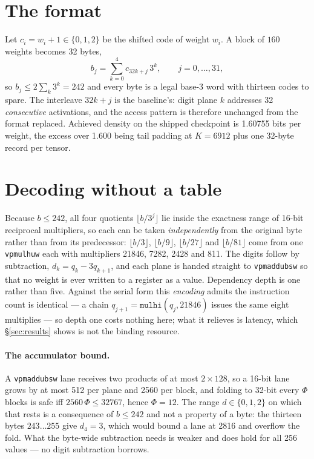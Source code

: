 \documentclass[11pt,a4paper]{article}
\newcommand{\code}[1]{\texttt{#1}}
\begin{document}
\section{The format}\label{sec:format}

Let $c_i=w_i+1\in\{0,1,2\}$ be the shifted code of weight $w_i$. A block of
$160$ weights becomes 32 bytes,
\begin{equation}
b_{j}=\sum_{k=0}^{4}c_{32k+j}\,3^{k},\qquad j=0,\dots,31,
\label{eq:pack}
\end{equation}
so $b_{j}\le 2\sum_{k}3^{k}=242$ and every byte is a legal base-3 word with
thirteen codes to spare. The interleave $32k+j$ is the baseline's: digit plane
$k$ addresses 32 \emph{consecutive} activations, and the access pattern is
therefore unchanged from the format replaced. Achieved density on the shipped
checkpoint is \num{1.60755} bits per weight, the excess over \num{1.600} being
tail padding at $K=\num{6912}$ plus one 32-byte record per tensor.

\section{Decoding without a table}\label{sec:kernel}

Because $b\le\num{242}$, all four quotients $\lfloor b/3^{j}\rfloor$ lie inside
the exactness range of 16-bit reciprocal multipliers, so each can be taken
\emph{independently} from the original byte rather than from its predecessor:
$\lfloor b/3\rfloor$, $\lfloor b/9\rfloor$, $\lfloor b/27\rfloor$ and
$\lfloor b/81\rfloor$ come from one \code{vpmulhuw} each with multipliers
\num{21846}, \num{7282}, \num{2428} and \num{811}. The digits follow by
subtraction, $d_{k}=q_{k}-3q_{k+1}$, and each plane is handed straight to
\code{vpmaddubsw} so that no weight is ever written to a register as a value.
Dependency depth is one rather than five. Against the serial form this
\emph{encoding} admits the instruction count is identical --- a chain
$q_{j+1}=\code{mulhi}(q_{j},\num{21846})$ issues the same eight multiplies ---
so depth one costs nothing here; what it relieves is latency, which
\S\ref{sec:results} shows is not the binding resource.

\paragraph{The accumulator bound.} A \code{vpmaddubsw} lane receives two
products of at most $2\times128$, so a 16-bit lane grows by at most 512 per
plane and \num{2560} per block, and folding to 32-bit every $\Phi$ blocks is
safe iff $\num{2560}\,\Phi\le\num{32767}$, hence $\Phi=12$. The range
$d\in\{0,1,2\}$ on which that rests is a consequence of $b\le\num{242}$ and not
a property of a byte: the thirteen bytes $243\ldots255$ give $d_{4}=3$, which
would bound a lane at \num{2816} and overflow the fold. What the byte-wide
subtraction needs is weaker and does hold for all 256 values --- no digit
subtraction borrows.
\end{document}
